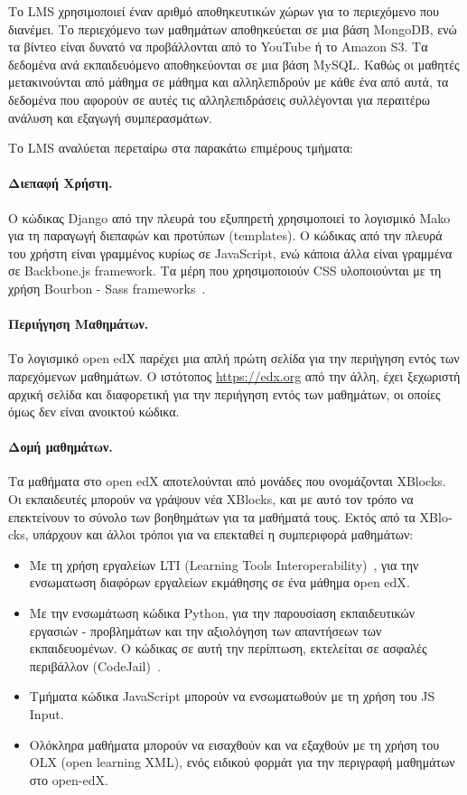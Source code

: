 \documentclass[12pt]{report}
\begin{document}
Το LMS χρησιμοποιεί έναν αριθμό αποθηκευτικών χώρων για το περιεχόμενο που διανέμει. Το περιεχόμενο των μαθημάτων αποθηκεύεται σε μια βάση \textlatin{MongoDB}, ενώ τα βίντεο είναι δυνατό να προβάλλονται από το \textlatin{YouTube} ή το \textlatin{Amazon S3}. Τα δεδομένα ανά εκπαιδευόμενο αποθηκεύονται σε μια βάση MySQL. Καθώς οι μαθητές μετακινούνται από μάθημα σε μάθημα και αλληλεπιδρούν με κάθε ένα από αυτά, τα δεδομένα που αφορούν σε αυτές τις αλληλεπιδράσεις συλλέγονται για περαιτέρω ανάλυση και εξαγωγή συμπερασμάτων.

Το \textlatin{LMS} αναλύεται περεταίρω στα παρακάτω επιμέρους τμήματα:
 \paragraph{Διεπαφή Χρήστη.} Ο κώδικας \textlatin{Django} από την πλευρά του εξυπηρετή χρησιμοποιεί το λογισμικό \textlatin{Mako} για τη παραγωγή διεπαφών και προτύπων (\textlatin{templates}). Ο κώδικας από την πλευρά του χρήστη είναι γραμμένος κυρίως σε \textlatin{JavaScript}, ενώ κάποια άλλα είναι γραμμένα σε \textlatin{Backbone.js framework}. Τα μέρη που χρησιμοποιούν \textlatin{CSS} υλοποιούνται με τη χρήση \textlatin{Bourbon - Sass frameworks}~\cite{edx_arch}.
 \paragraph{Περιήγηση Mαθημάτων.} Το λογισμικό \textlatin{open edX} παρέχει μια απλή πρώτη σελίδα για την περιήγηση εντός των παρεχόμενων μαθημάτων. Ο ιστότοπος \textlatin{\url{https://edx.org}} από την άλλη, έχει ξεχωριστή αρχική σελίδα και διαφορετική για την περιήγηση εντός των μαθημάτων, οι οποίες όμως δεν είναι ανοικτού κώδικα.
 \paragraph{Δομή μαθημάτων.} Τα μαθήματα στο \textlatin{open edX} αποτελούνται από μονάδες που ονομάζονται \textlatin{XBlocks}. Οι εκπαιδευτές μπορούν να γράψουν νέα \textlatin{XBlocks}, και με αυτό τον τρόπο να επεκτείνουν το σύνολο των βοηθημάτων για τα μαθήματά τους. Εκτός από τα \textlatin{XBlocks}, υπάρχουν και άλλοι τρόποι για να επεκταθεί η συμπεριφορά μαθημάτων:
\begin{itemize}
  \item Με τη χρήση εργαλείων \textlatin{LTI (Learning Tools Interoperability)}~\cite{lti}, για την ενσωματωση διαφόρων εργαλείων εκμάθησης σε ένα μάθημα \textlatin{οpen edX}.
  \item Με την ενσωμάτωση κώδικα \textlatin{Python}, για την παρουσίαση εκπαιδευτικών εργασιών - προβλημάτων και την αξιολόγηση των απαντήσεων των εκπαιδευομένων. Ο κώδικας σε αυτή την περίπτωση, εκτελείται σε ασφαλές περιβάλλον (\textlatin{CodeJail})~\cite{edx_arch}.
  \item Τμήματα κώδικα \textlatin{JavaScript} μπορούν να ενσωματωθούν με τη χρήση του \textlatin{JS Input}.
  \item Ολόκληρα μαθήματα μπορούν να εισαχθούν και να εξαχθούν με τη χρήση του \textlatin{OLX (open learning XML)}, ενός ειδικού φορμάτ για την περιγραφή μαθημάτων στο \textlatin{open-edX}.
\end{itemize}
\end{document}
